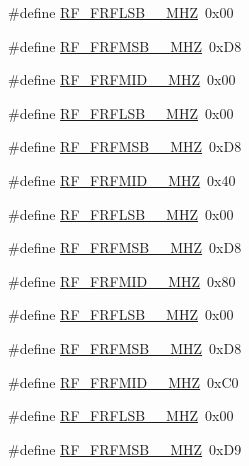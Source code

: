\begin{DoxyCompactItemize}
\item 
\#define \mbox{\hyperlink{sx1276_regs-_fsk_8h_aecfa3c2f5b34cd5f809bbf1e10e467d4}{R\+F\+\_\+\+F\+R\+F\+L\+S\+B\+\_\+\_\+\+M\+HZ}}~0x00
\item 
\#define \mbox{\hyperlink{sx1276_regs-_fsk_8h_a67e8381b0688a6cedc0a9809e841b1bc}{R\+F\+\_\+\+F\+R\+F\+M\+S\+B\+\_\+\_\+\+M\+HZ}}~0x\+D8
\item 
\#define \mbox{\hyperlink{sx1276_regs-_fsk_8h_a012de711e32ef9690d9a2af46ffbb5eb}{R\+F\+\_\+\+F\+R\+F\+M\+I\+D\+\_\+\_\+\+M\+HZ}}~0x00
\item 
\#define \mbox{\hyperlink{sx1276_regs-_fsk_8h_aa2fb137b9b0807073842bddad9257e56}{R\+F\+\_\+\+F\+R\+F\+L\+S\+B\+\_\+\_\+\+M\+HZ}}~0x00
\item 
\#define \mbox{\hyperlink{sx1276_regs-_fsk_8h_a4789261c437ac2f175c6ec70f67018c4}{R\+F\+\_\+\+F\+R\+F\+M\+S\+B\+\_\+\_\+\+M\+HZ}}~0x\+D8
\item 
\#define \mbox{\hyperlink{sx1276_regs-_fsk_8h_a95dd5d402da457617be796822d2cc015}{R\+F\+\_\+\+F\+R\+F\+M\+I\+D\+\_\+\_\+\+M\+HZ}}~0x40
\item 
\#define \mbox{\hyperlink{sx1276_regs-_fsk_8h_a7efd19de747f0506749b11e4f95401e9}{R\+F\+\_\+\+F\+R\+F\+L\+S\+B\+\_\+\_\+\+M\+HZ}}~0x00
\item 
\#define \mbox{\hyperlink{sx1276_regs-_fsk_8h_aa17560da4e17ee817c1bb624e8267a54}{R\+F\+\_\+\+F\+R\+F\+M\+S\+B\+\_\+\_\+\+M\+HZ}}~0x\+D8
\item 
\#define \mbox{\hyperlink{sx1276_regs-_fsk_8h_ab841e5262361314bd63eaa7b4bcb9218}{R\+F\+\_\+\+F\+R\+F\+M\+I\+D\+\_\+\_\+\+M\+HZ}}~0x80
\item 
\#define \mbox{\hyperlink{sx1276_regs-_fsk_8h_a5fa819f17598b9e573c36d6e780b3fb6}{R\+F\+\_\+\+F\+R\+F\+L\+S\+B\+\_\+\_\+\+M\+HZ}}~0x00
\item 
\#define \mbox{\hyperlink{sx1276_regs-_fsk_8h_a1fd84bcd8872d01855cba3d13fe3bc32}{R\+F\+\_\+\+F\+R\+F\+M\+S\+B\+\_\+\_\+\+M\+HZ}}~0x\+D8
\item 
\#define \mbox{\hyperlink{sx1276_regs-_fsk_8h_ab234cf9eacbcdd90a4533c2021003a3d}{R\+F\+\_\+\+F\+R\+F\+M\+I\+D\+\_\+\_\+\+M\+HZ}}~0x\+C0
\item 
\#define \mbox{\hyperlink{sx1276_regs-_fsk_8h_a3dd2b64da47687e9f790392f01273113}{R\+F\+\_\+\+F\+R\+F\+L\+S\+B\+\_\+\_\+\+M\+HZ}}~0x00
\item 
\#define \mbox{\hyperlink{sx1276_regs-_fsk_8h_a3d68b88442a5c8b7f80d9c615088220b}{R\+F\+\_\+\+F\+R\+F\+M\+S\+B\+\_\+\_\+\+M\+HZ}}~0x\+D9

\end{DoxyCompactItemize}
